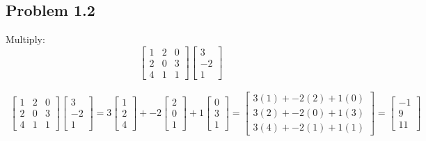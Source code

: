 \documentclass[12pt]{article}
\begin{document}
\subsection{Problem 1.2}\label{p1.2}
\begin{tcolorbox}[title=Problem 1.2]
Multiply: \begin{equation*}
  \begin{bmatrix}
    1 & 2 & 0\\
    2 & 0 & 3\\
    4 & 1 & 1
  \end{bmatrix}
  \begin{bmatrix}
  3\\
  -2\\
  1
  \end{bmatrix}
\end{equation*}
\end{tcolorbox}

\begin{align*}
  \begin{bmatrix}
    1 & 2 & 0\\ 
    2 & 0 & 3\\
    4 & 1 & 1 
  \end{bmatrix}
  \begin{bmatrix}
  3\\
  -2\\
  1
  \end{bmatrix} =
  3 \begin{bmatrix}
  1\\
  2\\
  4
  \end{bmatrix} +
  -2 \begin{bmatrix}
  2\\
  0\\
  1
  \end{bmatrix} + 
  1 \begin{bmatrix}
  0\\
  3\\
  1
  \end{bmatrix} =
  \begin{bmatrix}
  3(1) + -2(2) + 1(0)\\
  3(2) + -2(0) + 1(3)\\
  3(4) + -2(1) + 1(1)
  \end{bmatrix} =
  \begin{bmatrix}
  -1\\
  9\\
  11
  \end{bmatrix}
\end{align*}
\end{document}
